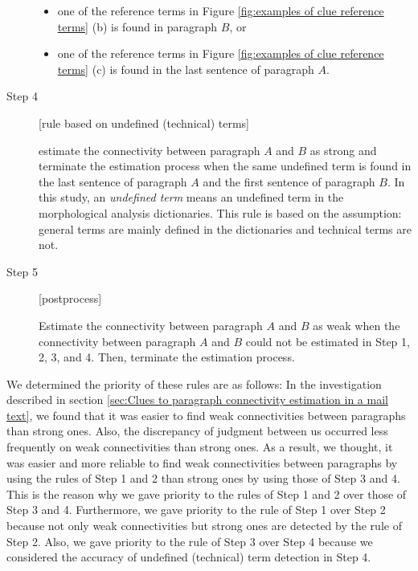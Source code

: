 \documentclass[english]{jnlp_1.4}
\begin{document}
\begin{description}
\begin{itemize}
	     \item one of the reference terms 
		   in Figure \ref{fig:examples of clue reference terms} (b)
		   is found in paragraph $B$, or

	     \item one of the reference terms 
		   in Figure \ref{fig:examples of clue reference terms} (c)
		   is found in the last sentence of paragraph $A$.
	    \end{itemize}

 \item[Step 4] [rule based on undefined (technical) terms]
	    
	    estimate the connectivity between paragraph $A$ and $B$ as strong
	    and terminate the estimation process
	    when the same undefined term is found in 
	    the last sentence of paragraph $A$ and 
	    the first sentence of paragraph $B$.
	    In this study, 
	    an \textit{undefined term} means an undefined term 
	    in the morphological analysis dictionaries.
	    This rule is based on the assumption:
	    general terms are mainly defined in the dictionaries and 
	    technical terms are not.

 \item[Step 5] [postprocess]

	    Estimate the connectivity between paragraph $A$ and $B$ as weak
	    when the connectivity between paragraph $A$ and $B$
	    could not be estimated in Step 1, 2, 3, and 4.
	    Then, terminate the estimation process.
	    

\end{description}



We determined the priority of these rules are as follows:
In the investigation described 
in section \ref{sec:Clues to paragraph connectivity estimation in a mail text}, 
we found that it was easier to find weak connectivities between paragraphs
than strong ones.
Also, 
the discrepancy of judgment between us occurred less frequently 
on weak connectivities than strong ones.
As a result, 
we thought, 
it was easier and more reliable to 
find weak connectivities between paragraphs by using the rules of Step 1 and 2 than 
strong ones by using those of Step 3 and 4.
This is the reason why 
we gave priority to the rules of Step 1 and 2  over those of Step 3 and 4.
Furthermore, 
we gave priority to the rule of Step 1 over Step 2 
because not only weak connectivities but strong ones are detected by the rule of Step 2.
Also, 
we gave priority to the rule of Step 3 over Step 4 
because we considered the accuracy of undefined (technical) term detection in Step 4.
\end{document}
